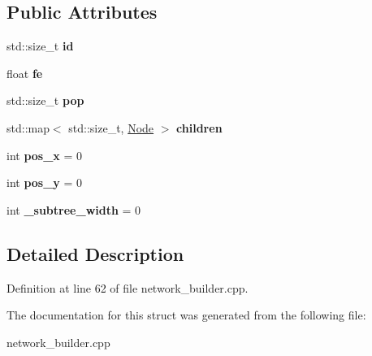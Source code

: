 \subsection*{Public Attributes}
\begin{DoxyCompactItemize}
\item 
\hypertarget{structanonymous__namespace_02network__builder_8cpp_03_1_1Node_ad8236efac50068fb50fd03c034d339d3}{std\-::size\-\_\-t {\bfseries id}}\label{structanonymous__namespace_02network__builder_8cpp_03_1_1Node_ad8236efac50068fb50fd03c034d339d3}

\item 
\hypertarget{structanonymous__namespace_02network__builder_8cpp_03_1_1Node_a4ff69465b55e0b4a59aed0d4894fdc3a}{float {\bfseries fe}}\label{structanonymous__namespace_02network__builder_8cpp_03_1_1Node_a4ff69465b55e0b4a59aed0d4894fdc3a}

\item 
\hypertarget{structanonymous__namespace_02network__builder_8cpp_03_1_1Node_aa88aaf563e6e6083aa0d00e038974967}{std\-::size\-\_\-t {\bfseries pop}}\label{structanonymous__namespace_02network__builder_8cpp_03_1_1Node_aa88aaf563e6e6083aa0d00e038974967}

\item 
\hypertarget{structanonymous__namespace_02network__builder_8cpp_03_1_1Node_ac801b09fbb8efb3e794c88cb0eefe29e}{std\-::map$<$ std\-::size\-\_\-t, \hyperlink{structanonymous__namespace_02network__builder_8cpp_03_1_1Node}{Node} $>$ {\bfseries children}}\label{structanonymous__namespace_02network__builder_8cpp_03_1_1Node_ac801b09fbb8efb3e794c88cb0eefe29e}

\item 
\hypertarget{structanonymous__namespace_02network__builder_8cpp_03_1_1Node_ae23ba041449a8720de7fafe143d3410f}{int {\bfseries pos\-\_\-x} = 0}\label{structanonymous__namespace_02network__builder_8cpp_03_1_1Node_ae23ba041449a8720de7fafe143d3410f}

\item 
\hypertarget{structanonymous__namespace_02network__builder_8cpp_03_1_1Node_a5cf7218bb01e3ef59b9a402d31efe3b5}{int {\bfseries pos\-\_\-y} = 0}\label{structanonymous__namespace_02network__builder_8cpp_03_1_1Node_a5cf7218bb01e3ef59b9a402d31efe3b5}

\item 
\hypertarget{structanonymous__namespace_02network__builder_8cpp_03_1_1Node_aa16ecdef24d7e4a2c4343de6ae4697a5}{int {\bfseries \-\_\-subtree\-\_\-width} = 0}\label{structanonymous__namespace_02network__builder_8cpp_03_1_1Node_aa16ecdef24d7e4a2c4343de6ae4697a5}

\end{DoxyCompactItemize}


\subsection{Detailed Description}


Definition at line 62 of file network\-\_\-builder.\-cpp.



The documentation for this struct was generated from the following file\-:\begin{DoxyCompactItemize}
\item 
network\-\_\-builder.\-cpp\end{DoxyCompactItemize}
